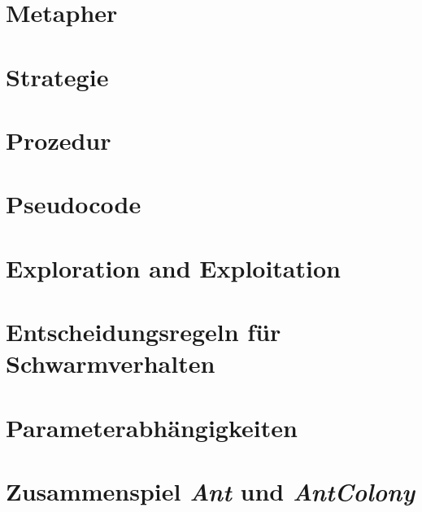 
\section{Metapher}

\section{Strategie}

\section{Prozedur}

\section{Pseudocode}

\section{Exploration and Exploitation}

\section{Entscheidungsregeln für Schwarmverhalten}

\section{Parameterabhängigkeiten}

\section{Zusammenspiel \emph{Ant} und \emph{AntColony}}